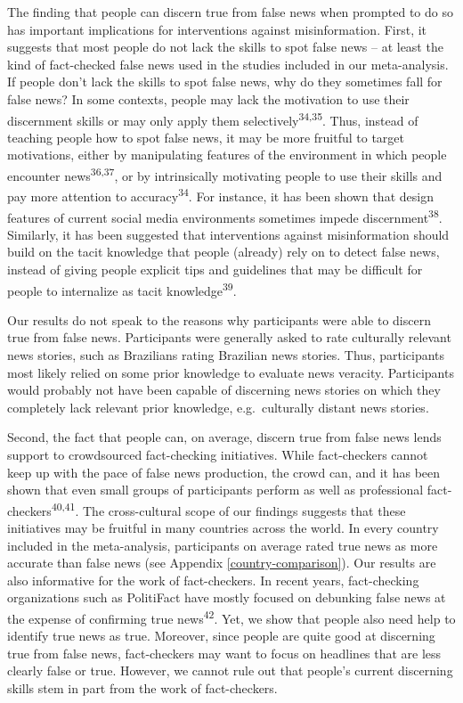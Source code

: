 \documentclass[
  man]{apa6}
\begin{document}
The finding that people can discern true from false news when prompted to do so has important implications for interventions against misinformation. First, it suggests that most people do not lack the skills to spot false news -- at least the kind of fact-checked false news used in the studies included in our meta-analysis. If people don't lack the skills to spot false news, why do they sometimes fall for false news? In some contexts, people may lack the motivation to use their discernment skills or may only apply them selectively\textsuperscript{34,35}. Thus, instead of teaching people how to spot false news, it may be more fruitful to target motivations, either by manipulating features of the environment in which people encounter news\textsuperscript{36,37}, or by intrinsically motivating people to use their skills and pay more attention to accuracy\textsuperscript{34}. For instance, it has been shown that design features of current social media environments sometimes impede discernment\textsuperscript{38}. Similarly, it has been suggested that interventions against misinformation should build on the tacit knowledge that people (already) rely on to detect false news, instead of giving people explicit tips and guidelines that may be difficult for people to internalize as tacit knowledge\textsuperscript{39}.

Our results do not speak to the reasons why participants were able to discern true from false news. Participants were generally asked to rate culturally relevant news stories, such as Brazilians rating Brazilian news stories. Thus, participants most likely relied on some prior knowledge to evaluate news veracity. Participants would probably not have been capable of discerning news stories on which they completely lack relevant prior knowledge, e.g.~culturally distant news stories.

Second, the fact that people can, on average, discern true from false news lends support to crowdsourced fact-checking initiatives. While fact-checkers cannot keep up with the pace of false news production, the crowd can, and it has been shown that even small groups of participants perform as well as professional fact-checkers\textsuperscript{40,41}. The cross-cultural scope of our findings suggests that these initiatives may be fruitful in many countries across the world. In every country included in the meta-analysis, participants on average rated true news as more accurate than false news (see Appendix \ref{country-comparison}). Our results are also informative for the work of fact-checkers. In recent years, fact-checking organizations such as PolitiFact have mostly focused on debunking false news at the expense of confirming true news\textsuperscript{42}. Yet, we show that people also need help to identify true news as true. Moreover, since people are quite good at discerning true from false news, fact-checkers may want to focus on headlines that are less clearly false or true. However, we cannot rule out that people's current discerning skills stem in part from the work of fact-checkers.
\end{document}

